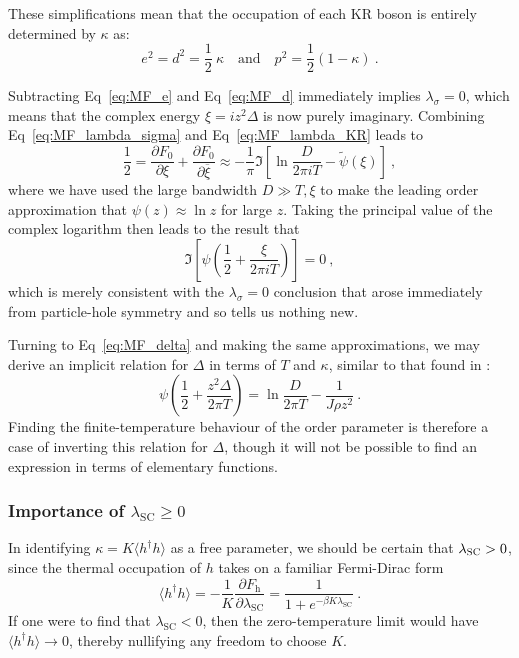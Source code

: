\documentclass[12pt]{article}
\begin{document}

These simplifications mean that the occupation of each KR boson is entirely determined by $ \kappa $ as:
\begin{equation}
e^2 = d^2 = \frac{1}{2} ~ \kappa \quad \text{and} \quad p^2 = \frac{1}{2} (1 - \kappa) ~ .
\label{eq:soln_KR}
\end{equation}

Subtracting Eq~\eqref{eq:MF_e} and Eq~\eqref{eq:MF_d} immediately implies $ \lambda_{\sigma} = 0 $, which means that the complex energy $ \xi = i z^2 \Delta $ is now purely imaginary. Combining Eq~\eqref{eq:MF_lambda_sigma} and Eq~\eqref{eq:MF_lambda_KR} leads to $$ \frac{1}{2} = \frac{\partial F_0}{\partial \xi} + \frac{\partial F_0}{\partial \overline{\xi}} \approx - \frac{1}{\pi} \Im{\left[ \ln{\frac{D}{2 \pi i T}} - \widetilde{\psi}(\xi) \right]} ~ , $$ where we have used the large bandwidth $ D \gg T, \xi $ to make the leading order approximation that $ \psi(z) \approx \ln{z} $ for large $ z $. Taking the principal value of the complex logarithm then leads to the result that $$ \Im{\left[ \psi \left( \frac{1}{2} + \frac{\xi}{2 \pi i T} \right) \right] = 0} ~ , $$ which is merely consistent with the $ \lambda_{\sigma} = 0 $ conclusion that arose immediately from particle-hole symmetry and so tells us nothing new.

Turning to Eq~\eqref{eq:MF_delta} and making the same approximations, we may derive an implicit relation for $ \Delta $ in terms of $ T $ and $ \kappa $, similar to that found in \cite{ManyBodyPhysics}:
\begin{equation}
\psi \left( \frac{1}{2} + \frac{z^2 \Delta}{2 \pi T} \right) = \ln{\frac{D}{2 \pi T}} - \frac{1}{J \rho z^2} ~ .
\label{eq:soln_delta}
\end{equation}
Finding the finite-temperature behaviour of the order parameter is therefore a case of inverting this relation for $ \Delta $, though it will not be possible to find an expression in terms of elementary functions. %

\subsubsection{Importance of $ \lambda_{\text{SC}} \geq 0 $}

In identifying $ \kappa = K \langle h^{\dagger} h \rangle $ as a free parameter, we should be certain that $ \lambda_{\textsc{SC}} > 0 $, since the thermal occupation of $ h $ takes on a familiar Fermi-Dirac form $$ \langle h^{\dagger} h \rangle = - \frac{1}{K} \frac{\partial F_{\text{h}}}{\partial \lambda_{\text{SC}}} = \frac{1}{1 + e^{- \beta K \lambda_{\text{SC}}}} ~. $$ If one were to find that $ \lambda_{\text{SC}} < 0 $, then the zero-temperature limit would have $ \langle h^{\dagger} h \rangle \rightarrow 0 $, thereby nullifying any freedom to choose $ K $.
\end{document}
